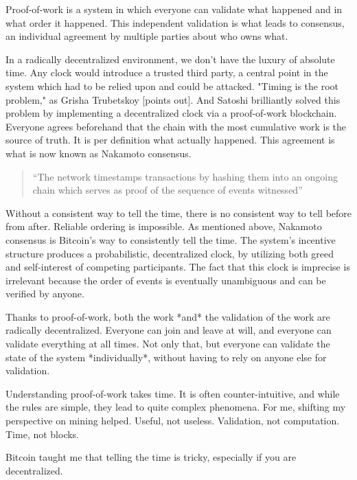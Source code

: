 Proof-of-work is a system in which everyone can validate what happened
and in what order it happened. This independent validation is what leads
to consensus, an individual agreement by multiple parties about who owns
what.

In a radically decentralized environment, we don't have the luxury of
absolute time. Any clock would introduce a trusted third party, a
central point in the system which had to be relied upon and could be
attacked. "Timing is the root problem," as Grisha Trubetskoy [points
out]. And Satoshi brilliantly solved this problem by implementing a
decentralized clock via a proof-of-work blockchain. Everyone agrees
beforehand that the chain with the most cumulative work is the source of
truth. It is per definition what actually happened. This agreement is
what is now known as Nakamoto consensus.

\begin{quotation}
``The network timestamps transactions by hashing them into an ongoing
chain which serves as proof of the sequence of events witnessed''
\end{quotation}

Without a consistent way to tell the time, there is no consistent way to
tell before from after. Reliable ordering is impossible. As mentioned
above, Nakamoto consensus is Bitcoin's way to consistently tell the
time. The system's incentive structure produces a probabilistic,
decentralized clock, by utilizing both greed and self-interest of
competing participants. The fact that this clock is imprecise is
irrelevant because the order of events is eventually unambiguous and can
be verified by anyone.

Thanks to proof-of-work, both the work *and* the validation of the work
are radically decentralized. Everyone can join and leave at will, and
everyone can validate everything at all times. Not only that, but
everyone can validate the state of the system *individually*, without
having to rely on anyone else for validation.

Understanding proof-of-work takes time. It is often counter-intuitive,
and while the rules are simple, they lead to quite complex phenomena.
For me, shifting my perspective on mining helped. Useful, not useless.
Validation, not computation. Time, not blocks.

Bitcoin taught me that telling the time is tricky, especially if you are
decentralized.

